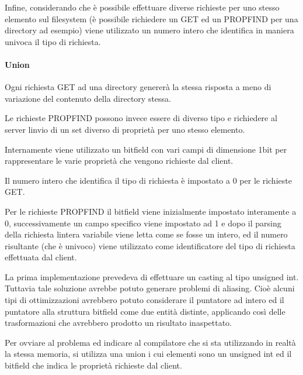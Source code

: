\documentclass[a4paper,11pt]{article}
\begin{document}
{\sffamily
Infine, considerando che \`e possibile effettuare diverse richieste per
uno stesso elemento sul filesystem (\`e possibile richiedere un GET ed
un PROPFIND per una directory ad esempio) viene utilizzato un numero
intero che identifica in maniera univoca il tipo di richiesta.}


\bigskip

\paragraph[Union]{Union}
{\sffamily
Ogni richiesta GET ad una directory generer\`a la stessa risposta a meno
di variazione del contenuto della directory stessa.}

{\sffamily
Le richieste PROPFIND possono invece essere di diverso tipo e richiedere
al server l{\textquotesingle}invio di un set diverso di propriet\`a per
uno stesso elemento.}

{\sffamily
Internamente viene utilizzato un bitfield con vari campi di dimensione
1bit per rappresentare le varie propriet\`a che vengono richieste dal
client.}


\bigskip

{\sffamily
Il numero intero che identifica il tipo di richiesta \`e impostato a 0
per le richieste GET.}

{\sffamily
Per le richieste PROPFIND il bitfield viene inizialmente impostato
interamente a 0, successivamente un campo specifico viene impostato ad
1 e dopo il parsing della richiesta l{\textquotesingle}intera variabile
viene letta come se fosse un intero, ed il numero risultante (che \`e
univoco) viene utilizzato come identificatore del tipo di richiesta
effettuata dal client.}


\bigskip

{\sffamily
La prima implementazione prevedeva di effettuare un casting al tipo
unsigned int. Tuttavia tale soluzione avrebbe potuto generare problemi
di aliasing. Cio\`e alcuni tipi di ottimizzazioni avrebbero potuto
considerare il puntatore ad intero ed il puntatore alla struttura
bitfield come due entit\`a distinte, applicando cos\`i delle
trasformazioni che avrebbero prodotto un risultato inaspettato.}

{\sffamily
Per ovviare al problema ed indicare al compilatore che si sta
utilizzando in realt\`a la stessa memoria, si utilizza una union i cui
elementi sono un unsigned int ed il bitfield che indica le propriet\`a
richieste dal client.}


\bigskip
\end{document}
